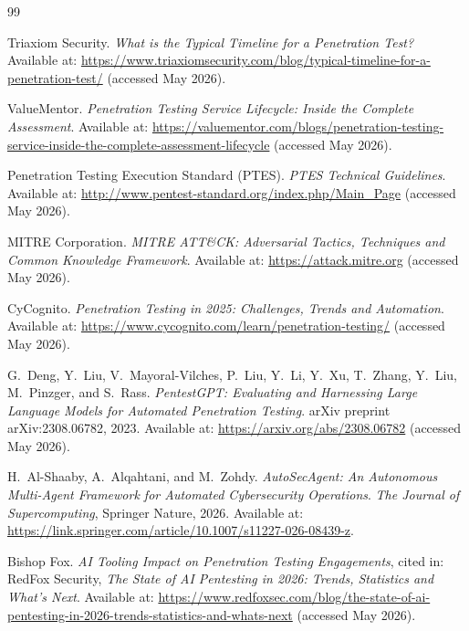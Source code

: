 \documentclass[12pt,a4paper]{report}
\begin{document}
\cleardoublepage
{}
\begin{thebibliography}{99}


Triaxiom Security.
\textit{What is the Typical Timeline for a Penetration Test?}
Available at: \url{https://www.triaxiomsecurity.com/blog/typical-timeline-for-a-penetration-test/}
(accessed May 2026).

ValueMentor.
\textit{Penetration Testing Service Lifecycle: Inside the Complete Assessment}.
Available at: \url{https://valuementor.com/blogs/penetration-testing-service-inside-the-complete-assessment-lifecycle}
(accessed May 2026).

Penetration Testing Execution Standard (PTES).
\textit{PTES Technical Guidelines}.
Available at: \url{http://www.pentest-standard.org/index.php/Main_Page}
(accessed May 2026).

MITRE Corporation.
\textit{MITRE ATT\&CK: Adversarial Tactics, Techniques and Common Knowledge Framework}.
Available at: \url{https://attack.mitre.org}
(accessed May 2026).

CyCognito.
\textit{Penetration Testing in 2025: Challenges, Trends and Automation}.
Available at: \url{https://www.cycognito.com/learn/penetration-testing/}
(accessed May 2026).


G.~Deng, Y.~Liu, V.~Mayoral-Vilches, P.~Liu, Y.~Li, Y.~Xu, T.~Zhang,
Y.~Liu, M.~Pinzger, and S.~Rass.
\textit{PentestGPT: Evaluating and Harnessing Large Language Models for
Automated Penetration Testing}.
arXiv preprint arXiv:2308.06782, 2023.
Available at: \url{https://arxiv.org/abs/2308.06782}
(accessed May 2026).

H.~Al-Shaaby, A.~Alqahtani, and M.~Zohdy.
\textit{AutoSecAgent: An Autonomous Multi-Agent Framework for Automated
Cybersecurity Operations}.
\textit{The Journal of Supercomputing}, Springer Nature, 2026.
Available at: \url{https://link.springer.com/article/10.1007/s11227-026-08439-z}.

Bishop Fox.
\textit{AI Tooling Impact on Penetration Testing Engagements},
cited in: RedFox Security, \textit{The State of AI Pentesting in 2026:
Trends, Statistics and What's Next}.
Available at: \url{https://www.redfoxsec.com/blog/the-state-of-ai-pentesting-in-2026-trends-statistics-and-whats-next}
(accessed May 2026).


\end{thebibliography}
\end{document}
